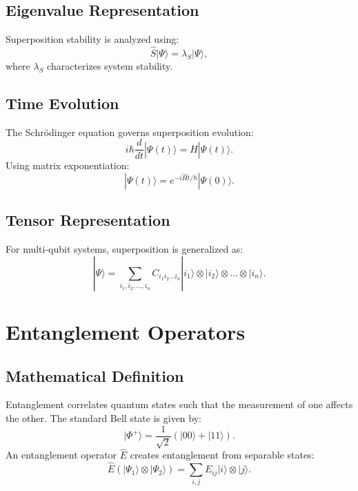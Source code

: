 \documentclass{article}
\theoremstyle{plain}
\begin{document}
\begin{itemize}
\subsection{Eigenvalue Representation}
Superposition stability is analyzed using:
\begin{equation}
    \hat{S} |\Psi\rangle = \lambda_S |\Psi\rangle,
\end{equation}
where $\lambda_S$ characterizes system stability.

\subsection{Time Evolution}
The Schrödinger equation governs superposition evolution:
\begin{equation}
    i \hbar \frac{d}{dt} |\Psi(t)\rangle = \hat{H} |\Psi(t)\rangle.
\end{equation}
Using matrix exponentiation:
\begin{equation}
    |\Psi(t)\rangle = e^{-i \hat{H} t / \hbar} |\Psi(0)\rangle.
\end{equation}

\subsection{Tensor Representation}
For multi-qubit systems, superposition is generalized as:
\begin{equation}
    |\Psi\rangle = \sum_{i_1, i_2, \dots, i_n} C_{i_1 i_2 \dots i_n} |i_1\rangle \otimes |i_2\rangle \otimes \dots \otimes |i_n\rangle.
\end{equation}

\section{Entanglement Operators}

\subsection{Mathematical Definition}
Entanglement correlates quantum states such that the measurement of one affects the other. The standard Bell state is given by:
\begin{equation}
    |\Phi^+\rangle = \frac{1}{\sqrt{2}} (|00\rangle + |11\rangle).
\end{equation}
An entanglement operator $\hat{E}$ creates entanglement from separable states:
\begin{equation}
    \hat{E} (|\Psi_1\rangle \otimes |\Psi_2\rangle) = \sum_{i, j} E_{ij} |i\rangle \otimes |j\rangle.
\end{equation}


\end{itemize}
\end{document}
